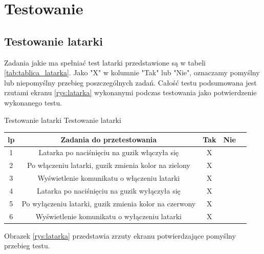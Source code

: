 	\newpage
\section{Testowanie}	%


\subsection{Testowanie latarki}

Zadania jakie ma spełniać test latarki przedstawione są w tabeli \ref{tab:tablica_latarka}. Jako "X" w kolumnie "Tak" lub "Nie", oznaczamy pomyślny lub niepomyślny przebieg poszczególnych zadań. Całość testu podsumowana jest rzutami ekranu \ref{rys:latarka} wykonanymi podczas testowania jako potwierdzenie wykonanego testu.

\begin{tabela}
	{Testowanie latarki}	%
	{Testowanie latarki}	%
	{
		\begin{tabular}{|c|c|c|c|c|} \hline
			\textbf{lp} & \textbf{Zadania do przetestowania} & \textbf{Tak} & \textbf{Nie} \\ \hline
			1 & Latarka po naciśnięciu na guzik włączyła się & X & ~ \\ \hline
			2 & Po włączeniu latarki, guzik zmienia kolor na zielony & X & ~ \\ \hline
			3 & Wyświetlenie komunikatu o włączeniu latarki & X & ~ \\ \hline
			4 & Latarka po naciśnięciu na guzik wyłączyła się & X & ~ \\ \hline
			5 & Po wyłączeniu latarki, guzik zmienia kolor na czerwony & X & ~ \\ \hline
			6 & Wyświetlenie komunikatu o wyłączeniu latarki & X & ~ \\ \hline
		\end{tabular}	}
	\label{tab:tablica_latarka}
\end{tabela}

Obrazek \ref{rys:latarka} przedstawia zrzuty ekranu potwierdzające pomyślny przebieg testu.

